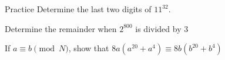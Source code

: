 \documentclass{beamer}
\begin{document}
\begin{frame}{Practice}
    \vspace{-2em}
    Determine the last two digits of $11^{32}$.     \vspace{4em}
    
    Determine the remainder when $2^{800}$ is divided by $3$ \vspace{4em}

    
    If $a \equiv b \pmod N$, show that $8a(a^{20} + a^4) \equiv 8b(b^{20} + b^4)$ \vspace{4em}
    
\end{frame}
\end{document}
